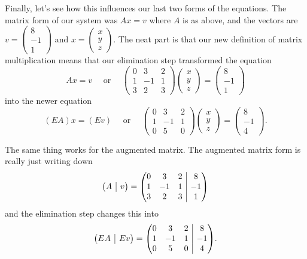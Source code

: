 \documentclass[11pt]{amsart}
\makeatletter
\theoremstyle{definition}
\newenvironment{amatrix}[1]{%
  \left(\begin{array}{@{}*{#1}{c}|c@{}}
}{%
  \end{array}\right)
}
\makeatother
\begin{document}
Finally, let's see how this influences our last two forms of the equations. The matrix form of our system was $Ax = v$ where $A$ is as above, and the vectors are $v = \left(\begin{smallmatrix} 8 \\ -1 \\ 1 \end{smallmatrix}\right)$ and $x = \left( \begin{smallmatrix} x \\ y \\ z \end{smallmatrix}\right)$.
The neat part is that our new definition of matrix multiplication means that our elimination step transformed the equation
\[
Ax = v \quad \text{ or }\quad
\begin{pmatrix} 0 & 3 & 2 \\ 1 & -1 & 1 \\ 3 & 2 & 3 \end{pmatrix} \begin{pmatrix} x \\ y \\ z \end{pmatrix} = \begin{pmatrix} 8 \\ -1 \\ 1 \end{pmatrix}
\]
into the newer equation
\[
(EA) x = (Ev) \quad \text{ or } \quad \begin{pmatrix} 0 & 3 & 2 \\ 1 & -1 & 1 \\ 0 & 5 & 0 \end{pmatrix} \begin{pmatrix} x \\ y \\ z \end{pmatrix} = \begin{pmatrix} 8 \\ -1 \\ 4 \end{pmatrix}.
\]

The same thing works for the augmented matrix. The augmented matrix form is really just writing down
\[
\begin{amatrix}{1} A & v \end{amatrix}
=\begin{amatrix}{3}
0 & 3 & 2 & 8\\ 1 & -1 & 1 & -1\\ 3 & 2 & 3 & 1
\end{amatrix}
\]
and the elimination step changes this into
\[
\begin{amatrix}{1}
EA & Ev
\end{amatrix}
= \begin{amatrix}{3}
0 & 3 & 2 & 8 \\ 1 & -1 & 1 & -1 \\ 0 & 5 & 0 & 4
\end{amatrix}
.
\]
\end{document}
